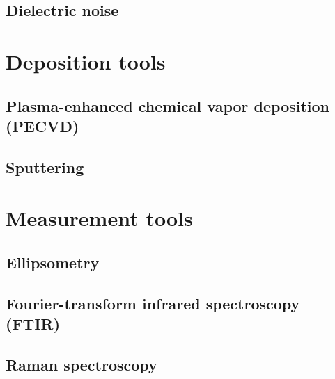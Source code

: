 \subsection{Dielectric noise}
\label{sec:related:sec3}
\Blindtext[4][2]
\section{Deposition tools}
\subsection{Plasma-enhanced chemical vapor deposition (PECVD)}
\subsection{Sputtering}
\section{Measurement tools}
\subsection{Ellipsometry}
\subsection{Fourier-transform infrared spectroscopy (FTIR)}
\subsection{Raman spectroscopy}
